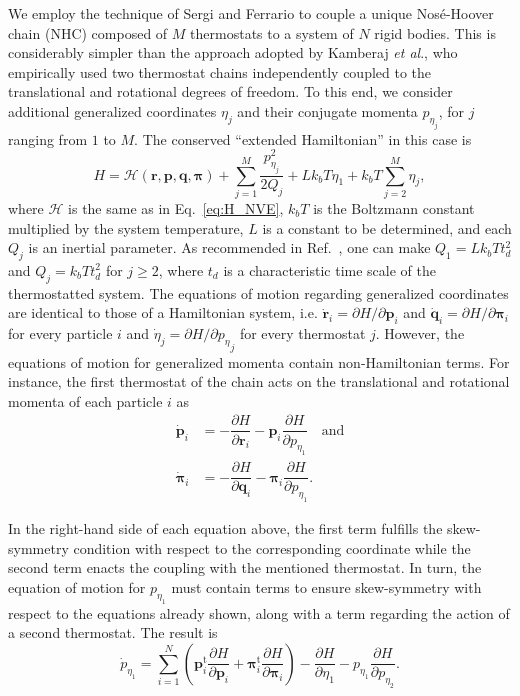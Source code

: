 \documentclass[aip,jcp,reprint,amsmath,amssymb]{revtex4-1}
\newcommand{\vt}[1]{\boldsymbol{\mathbf{#1}}}           %
\newcommand{\tr}[1]{#1^\text{t}}                        %
\newcommand{\diff}[2]{\dfrac{\partial #1}{\partial #2}} %
\begin{document}
We employ the technique of Sergi and Ferrario\cite{Sergi2001} to couple a unique Nos\'e-Hoover chain\cite{Martyna1992} (NHC) composed of $M$ thermostats to a system of $N$ rigid bodies. This is considerably simpler than the approach adopted by Kamberaj \textit{et al}.,\cite{Kamberaj2005} who empirically used two thermostat chains independently coupled to the translational and rotational degrees of freedom. To this end, we consider additional generalized coordinates $\eta_j$ and their conjugate momenta $p_{\eta_j}$, for $j$ ranging from $1$ to $M$. The conserved ``extended Hamiltonian'' in this case is
\begin{equation}
\label{eq:H_nvt}
H = \mathcal{H}(\vt r,\vt p,\vt q,\vt \pi) + \sum_{j=1}^{M}\frac{p_{\eta_j}^2}{2Q_j} + L k_b T\eta_1 + k_b T\sum_{j=2}^M \eta_j,
\end{equation}
where $\mathcal H$ is the same as in Eq.~\ref{eq:H_NVE}, $k_b T$ is the Boltzmann constant multiplied by the system temperature, $L$ is a constant to be determined, and each $Q_j$ is an inertial parameter. As recommended in Ref.~, one can make $Q_1 = L k_b T t_d^2$ and $Q_j = k_b T t_d^2$ for $j \geq 2$, where $t_d$ is a characteristic time scale of the thermostatted system. The equations of motion regarding generalized coordinates are identical to those of a Hamiltonian system, i.e. $\dot{\vt r}_i = {\partial H}/{\partial \vt p_i}$ and $\dot{\vt q}_i = {\partial H}/{\partial \vt \pi_i}$ for every particle $i$ and $\dot{\eta}_j = {\partial H}/{\partial {p_\eta}_j}$ for every thermostat $j$. However, the equations of motion for generalized momenta contain non-Hamiltonian terms. For instance, the first thermostat of the chain acts on the translational and rotational momenta of each particle $i$ as
\[
\begin{split}
\dot{\vt p}_i &= -\diff{H}{\vt r_i} - {\vt p}_i \diff{H}{p_{\eta_1}} \quad \text{and} \\
\dot{\vt \pi}_i &= -\diff{H}{\vt q_i} - {\vt \pi}_i \diff{H}{p_{\eta_1}}.
\end{split}
\]

In the right-hand side of each equation above, the first term fulfills the skew-symmetry condition with respect to the corresponding coordinate while the second term enacts the coupling with the mentioned thermostat. In turn, the equation of motion for $p_{\eta_1}$ must contain terms to ensure skew-symmetry with respect to the equations already shown, along with a term regarding the action of a second thermostat. The result is
\[
{\dot p}_{\eta_1} = \sum_{i=1}^N \left( \tr{\vt p_i} \diff{H}{\vt p_i} + \tr{\vt \pi_i} \diff{H}{\vt \pi_i}\right) - \diff{H}{\eta_1} - p_{\eta_1} \diff{H}{p_{\eta_2}}.
\]
\end{document}
